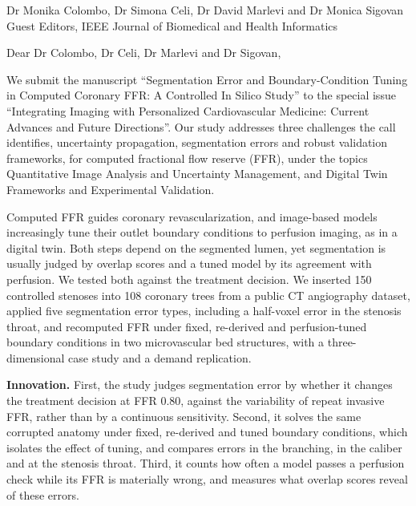 \documentclass[10pt]{letter}
\date{\today}
\begin{document}
\begin{letter}{Dr Monika Colombo, Dr Simona Celi, Dr David Marlevi and Dr Monica Sigovan\\Guest Editors, IEEE Journal of Biomedical and Health Informatics}
\opening{Dear Dr Colombo, Dr Celi, Dr Marlevi and Dr Sigovan,}

We submit the manuscript ``Segmentation Error and Boundary-Condition Tuning in Computed Coronary FFR: A Controlled
In Silico Study'' to the special issue ``Integrating Imaging with Personalized Cardiovascular Medicine: Current
Advances and Future Directions''. Our study addresses three challenges the call identifies, uncertainty propagation, segmentation errors
and robust validation frameworks, for computed fractional flow reserve (FFR), under the topics Quantitative Image Analysis and Uncertainty
Management, and Digital Twin Frameworks and Experimental Validation.

Computed FFR guides coronary revascularization, and image-based models increasingly tune their outlet boundary
conditions to perfusion imaging, as in a digital twin. Both steps depend on the segmented lumen, yet segmentation is
usually judged by overlap scores and a tuned model by its agreement with perfusion. We tested both against the
treatment decision. We inserted 150 controlled stenoses into 108 coronary trees from a public CT angiography dataset,
applied five segmentation error types, including a half-voxel error in the stenosis throat, and recomputed FFR under
fixed, re-derived and perfusion-tuned boundary conditions in two microvascular bed structures, with a
three-dimensional case study and a demand replication.

\textbf{Innovation.} First, the study judges segmentation error by whether it changes the treatment decision at FFR
0.80, against the variability of repeat invasive FFR, rather than by a continuous sensitivity. Second, it solves the
same corrupted anatomy under fixed, re-derived and tuned boundary conditions, which isolates the effect of tuning, and
compares errors in the branching, in the caliber and at the stenosis throat. Third, it counts how often a model passes
a perfusion check while its FFR is materially wrong, and measures what overlap scores reveal of these errors.


\end{letter}
\end{document}
